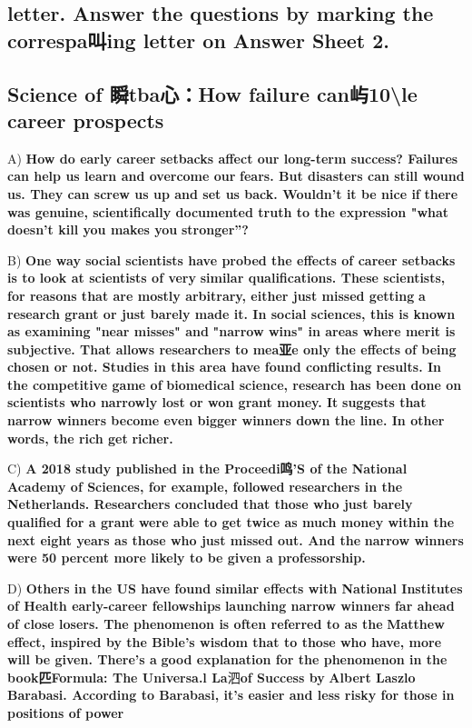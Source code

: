 \documentclass[UTF8,11pt]{ctexart}
\begin{document}
\subsection*{\textbf{letter. Answer the questions by marking the correspa叫ing letter on Answer Sheet 2.}}


\subsection*{\textbf{Science of} 瞬\textbf{tba心：How failure can屿10\textbackslash{}le career prospects}}


A) \textbf{How do early career setbacks affect our long-term success? Failures can help us learn and overcome our} \textbf{fears. But disasters can still wound us. They can screw us up and set us back. Wouldn't it be nice if} \textbf{there was genuine, scientifically documented truth to the expression "what doesn't kill you makes you} \textbf{stronger''?}


B) \textbf{One way social scientists have probed the effects of career setbacks is to look at scientists of very} \textbf{similar qualifications. These scientists, for reasons that are mostly arbitrary, either just missed getting} \textbf{a research grant or just barely made it. In social sciences, this is known as examining "near misses" and} \textbf{"narrow wins" in areas where merit is subjective. That allows researchers to mea亚e only the effects} \textbf{of being chosen or not. Studies in this area have found conflicting results. In the competitive game of} \textbf{biomedical science, research has been done on scientists who narrowly lost or won grant money. It} \textbf{suggests that narrow winners become even bigger winners down the line. In other words, the rich get} \textbf{richer.}


C) \textbf{A 2018 study published in the Proceedi鸣'S of the National Academy of Sciences, for example, followed} \textbf{researchers in the Netherlands. Researchers concluded that those who just barely qualified for a grant} \textbf{were able to get twice as much money within the next eight years as those who just missed out. And the} \textbf{narrow winners were 50 percent more likely to be given a professorship.}


D) \textbf{Others in the US have found similar effects with National Institutes of Health early-career fellowships} \textbf{launching narrow winners far ahead of close losers. The phenomenon is often referred to as the} \textbf{Matthew effect, inspired by the Bible's wisdom that to those who have, more will be given. There's a} \textbf{good explanation for the phenomenon in the book匹Formula: The Universa.l La}泗\textbf{of Success by} \textbf{Albert Laszlo Barabasi. According to Barabasi, it's easier and less risky for those in positions of power}
\end{document}
